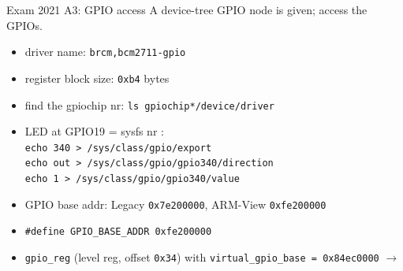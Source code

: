 \begin{example2}{Exam 2021 A3: GPIO access}
    A device-tree GPIO node is given; access the GPIOs.
    \tcblower
    \begin{itemize}
        \item {} driver name: \texttt{brcm,bcm2711-gpio}
        \item {} register block size: \texttt{0xb4} bytes
        \item {} find the gpiochip nr: \texttt{ls gpiochip*/device/driver}
        \item {} LED at GPIO19 = sysfs nr :\\
              \texttt{echo 340 > /sys/class/gpio/export}\\
              \texttt{echo out > /sys/class/gpio/gpio340/direction}\\
              \texttt{echo 1 > /sys/class/gpio/gpio340/value}
        \item {} GPIO base addr: Legacy \texttt{0x7e200000},
              ARM-View \texttt{0xfe200000}
        \item {} \texttt{\#define GPIO\_BASE\_ADDR 0xfe200000}
        \item {} \texttt{gpio\_reg} (level reg, offset \texttt{0x34}) with
              \texttt{virtual\_gpio\_base = 0x84ec0000} $\to$
    \end{itemize}
\end{example2}

\raggedcolumns

